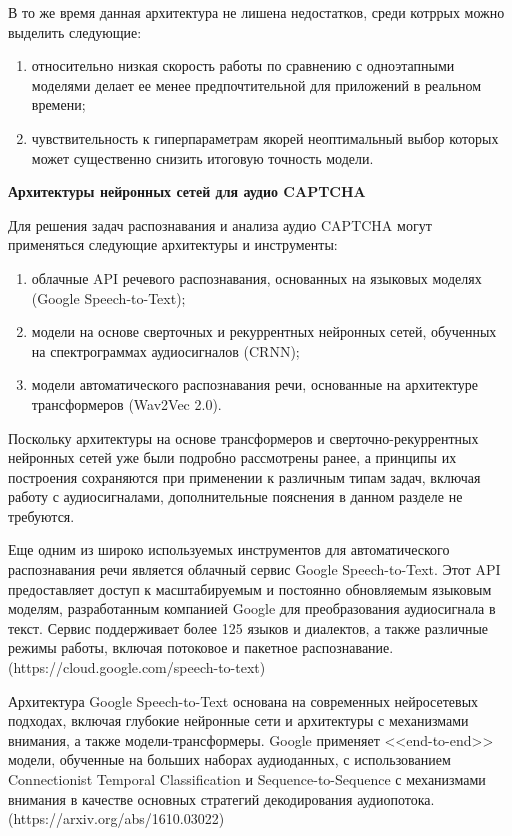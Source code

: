 В то же время данная архитектура не лишена недостатков, среди котррых можно 
выделить следующие:

\begin{enumerate}
    \item относительно низкая скорость работы по сравнению с одноэтапными 
    моделями делает ее менее предпочтительной для приложений в реальном времени;
    \item чувствительность к гиперпараметрам якорей неоптимальный выбор которых 
    может существенно снизить итоговую точность модели.
\end{enumerate}

\textbf{Архитектуры нейронных сетей для аудио CAPTCHA}

Для решения задач распознавания и анализа аудио CAPTCHA могут применяться 
следующие архитектуры и инструменты:

\begin{enumerate}
    \item облачные API речевого распознавания, основанных на языковых моделях 
    (Google Speech-to-Text);
    \item модели на основе сверточных и рекуррентных нейронных сетей, обученных 
    на спектрограммах аудиосигналов (CRNN);
    \item модели автоматического распознавания речи, основанные на архитектуре 
    трансформеров (Wav2Vec 2.0).
\end{enumerate}

Поскольку архитектуры на основе трансформеров и сверточно-рекуррентных нейронных 
сетей уже были подробно рассмотрены ранее, а принципы их построения сохраняются 
при применении к различным типам задач, включая работу с аудиосигналами, 
дополнительные пояснения в данном разделе не требуются.

Еще одним из широко используемых инструментов для автоматического распознавания 
речи является облачный сервис Google Speech-to-Text. Этот API предоставляет 
доступ к масштабируемым и постоянно обновляемым языковым моделям, разработанным 
компанией Google для преобразования аудиосигнала в текст. Сервис поддерживает 
более 125 языков и диалектов, а также различные режимы работы, включая потоковое 
и пакетное распознавание.(https://cloud.google.com/speech-to-text)

Архитектура Google Speech-to-Text основана на современных нейросетевых подходах, 
включая глубокие нейронные сети и архитектуры с механизмами внимания, а также 
модели-трансформеры. Google применяет <<end-to-end>> модели, обученные на больших 
наборах аудиоданных, с использованием Connectionist Temporal Classification и 
Sequence-to-Sequence с механизмами внимания в качестве основных стратегий 
декодирования аудиопотока.(https://arxiv.org/abs/1610.03022)

